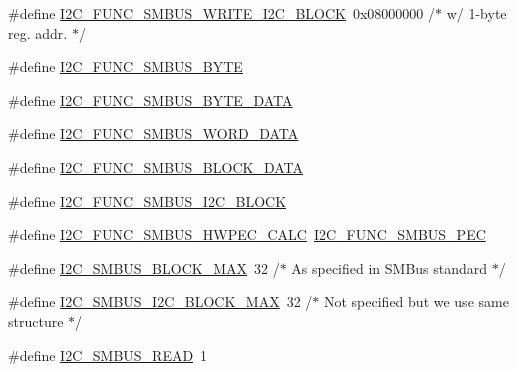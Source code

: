\begin{DoxyCompactItemize}
\item 
\#define \hyperlink{smbus-cffi-0_83_82_2include_2linux_2i2c-dev_8h_a87990a457cb6785821f82eddd5bda85e}{I2\+C\+\_\+\+F\+U\+N\+C\+\_\+\+S\+M\+B\+U\+S\+\_\+\+W\+R\+I\+T\+E\+\_\+\+I2\+C\+\_\+\+B\+L\+O\+C\+K}~0x08000000 /$\ast$ w/ 1-\/byte reg. addr. $\ast$/
\item 
\#define \hyperlink{smbus-cffi-0_83_82_2include_2linux_2i2c-dev_8h_a0e940355fb6532a740e57aece17c670c}{I2\+C\+\_\+\+F\+U\+N\+C\+\_\+\+S\+M\+B\+U\+S\+\_\+\+B\+Y\+T\+E}
\item 
\#define \hyperlink{smbus-cffi-0_83_82_2include_2linux_2i2c-dev_8h_a3d09bc1b4dfbf7336abf83e477419b90}{I2\+C\+\_\+\+F\+U\+N\+C\+\_\+\+S\+M\+B\+U\+S\+\_\+\+B\+Y\+T\+E\+\_\+\+D\+A\+T\+A}
\item 
\#define \hyperlink{smbus-cffi-0_83_82_2include_2linux_2i2c-dev_8h_a1448936de71a0846193adbde34900948}{I2\+C\+\_\+\+F\+U\+N\+C\+\_\+\+S\+M\+B\+U\+S\+\_\+\+W\+O\+R\+D\+\_\+\+D\+A\+T\+A}
\item 
\#define \hyperlink{smbus-cffi-0_83_82_2include_2linux_2i2c-dev_8h_aef52b94d71c11d2849c6f3ae62d0e29b}{I2\+C\+\_\+\+F\+U\+N\+C\+\_\+\+S\+M\+B\+U\+S\+\_\+\+B\+L\+O\+C\+K\+\_\+\+D\+A\+T\+A}
\item 
\#define \hyperlink{smbus-cffi-0_83_82_2include_2linux_2i2c-dev_8h_ad94ca1f256004b790c2feb762ff963e7}{I2\+C\+\_\+\+F\+U\+N\+C\+\_\+\+S\+M\+B\+U\+S\+\_\+\+I2\+C\+\_\+\+B\+L\+O\+C\+K}
\item 
\#define \hyperlink{smbus-cffi-0_83_82_2include_2linux_2i2c-dev_8h_a21b4983c1a932e11d566a9e11734e4a8}{I2\+C\+\_\+\+F\+U\+N\+C\+\_\+\+S\+M\+B\+U\+S\+\_\+\+H\+W\+P\+E\+C\+\_\+\+C\+A\+L\+C}~\hyperlink{smbus-cffi-0_83_82_2include_2linux_2i2c-dev_8h_aef3b905e021dbe7aaf98da89c4648764}{I2\+C\+\_\+\+F\+U\+N\+C\+\_\+\+S\+M\+B\+U\+S\+\_\+\+P\+E\+C}
\item 
\#define \hyperlink{smbus-cffi-0_83_82_2include_2linux_2i2c-dev_8h_ac2dd8b77e329bba4a3ca9cd275f9bf50}{I2\+C\+\_\+\+S\+M\+B\+U\+S\+\_\+\+B\+L\+O\+C\+K\+\_\+\+M\+A\+X}~32	/$\ast$ As specified in S\+M\+Bus standard $\ast$/
\item 
\#define \hyperlink{smbus-cffi-0_83_82_2include_2linux_2i2c-dev_8h_a13045bd7a62d8d55acbcf174b7149cbf}{I2\+C\+\_\+\+S\+M\+B\+U\+S\+\_\+\+I2\+C\+\_\+\+B\+L\+O\+C\+K\+\_\+\+M\+A\+X}~32	/$\ast$ Not specified but we use same structure $\ast$/
\item 
\#define \hyperlink{smbus-cffi-0_83_82_2include_2linux_2i2c-dev_8h_a8f5482668eb7741ef21dd9c211d876c9}{I2\+C\+\_\+\+S\+M\+B\+U\+S\+\_\+\+R\+E\+A\+D}~1
\item 

\end{DoxyCompactItemize}
